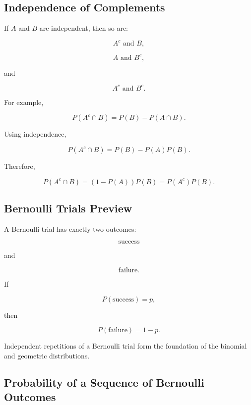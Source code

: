 \subsection{Independence of Complements}
\label{subsec:independence-complements}

If \(A\) and \(B\) are independent, then so are:

\[
A^c\text{ and }B,
\]

\[
A\text{ and }B^c,
\]

and

\[
A^c\text{ and }B^c.
\]

For example,

\[
P(A^c\cap B)
=
P(B)-P(A\cap B).
\]

Using independence,

\[
P(A^c\cap B)
=
P(B)-P(A)P(B).
\]

Therefore,

\[
P(A^c\cap B)
=
(1-P(A))P(B)
=
P(A^c)P(B).
\]

\subsection{Bernoulli Trials Preview}
\label{subsec:bernoulli-trials-preview}

A Bernoulli trial has exactly two outcomes:

\[
\boxed{
\text{success}
}
\]

and

\[
\boxed{
\text{failure}.
}
\]

If

\[
P(\text{success})=p,
\]

then

\[
P(\text{failure})=1-p.
\]

Independent repetitions of a Bernoulli trial form the foundation of the
binomial and geometric distributions.

\subsection{Probability of a Sequence of Bernoulli Outcomes}
\label{subsec:bernoulli-sequence}

